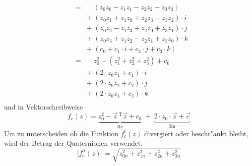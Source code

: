 \begin{refsection}
\begin{equation}
\begin{array}{lcl}
				& = &\;\;\;\, (z_0 z_0 - z_1 z_1 - z_2 z_2 - z_3 z_3)\\
				&& +\; (z_0 z_1 + z_1 z_0 + z_2 z_3 - z_3 z_2)\cdot i\\
				&& +\; (z_0 z_2 - z_1 z_3 + z_2 z_0 + z_3 z_1)\cdot j\\
				&& +\; (z_0 z_3 + z_1 z_2 - z_2 z_1 + z_3 z_0)\cdot k\\
				&& +\; (c_0 + c_1\cdot i + c_2\cdot j + c_3\cdot k)\\[0.3cm]
				& = & \;\;\;\, z_0^2 - (z_1^2 + z_2^2 + z_3^2) + c_0\\
				&& +\; (2\cdot z_0 z_1 + c_1)\cdot i\\
				&& +\; (2\cdot z_0 z_2 + c_2)\cdot j\\
				&& +\; (2\cdot z_0 z_3 + c_3)\cdot k\\
			\end{array}
			\label{equ. quaternionItFormel}
		\end{equation}
		und in Vektorschreibweise
		\begin{equation}
			f_c(z) = \underbrace{z_0^2 - \vec z\,^{\mathrm T}\vec z  + c_0}_{\operatorname{Re}} \;+\; \underbrace{2\cdot z_0 \cdot \vec z + \vec c}_{\operatorname{Im}}
			\label{equ. quaternionItFormelVec}
		\end{equation}		
		Um zu unterscheiden ob die Funktion $f_c^i(z)$ divergiert oder beschr"ankt bleibt, wird der Betrag der Quaternionen verwendet.
		\begin{equation}
			|f_c^n(z)| = \sqrt{z_{0n}^2+z_{1n}^2+z_{2n}^2+z_{3n}^2}
			\label{equ. quaternionBetrag}
		\end{equation}


\end{refsection}
